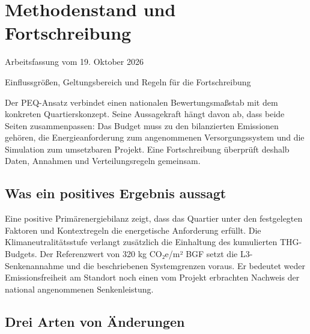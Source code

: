 \documentclass[
  ngerman,
  a4paper,
  DIV=11]{scrreprt}
\begin{document}
\chapter{Methodenstand und Fortschreibung}\label{sec-fortschreibung}

\begin{tcolorbox}[enhanced jigsaw, arc=.35mm, bottomrule=.15mm, breakable, colback=white, colframe=quarto-callout-note-color-frame, left=2mm, leftrule=.75mm, opacityback=0, rightrule=.15mm, toprule=.15mm]
\begin{minipage}[t]{5.5mm}
\textcolor{quarto-callout-note-color}{\faInfo}
\end{minipage}%
\begin{minipage}[t]{\textwidth - 5.5mm}

Arbeitsfassung vom 19. Oktober 2026

\end{minipage}%
\end{tcolorbox}

Einflussgrößen, Geltungsbereich und Regeln für die Fortschreibung

Der PEQ-Ansatz verbindet einen nationalen Bewertungsmaßstab mit dem
konkreten Quartierskonzept. Seine Aussagekraft hängt davon ab, dass
beide Seiten zusammenpassen: Das Budget muss zu den bilanzierten
Emissionen gehören, die Energieanforderung zum angenommenen
Versorgungssystem und die Simulation zum umsetzbaren Projekt. Eine
Fortschreibung überprüft deshalb Daten, Annahmen und Verteilungsregeln
gemeinsam.

\section{Was ein positives Ergebnis
aussagt}\label{was-ein-positives-ergebnis-aussagt}

Eine positive Primärenergiebilanz zeigt, dass das Quartier unter den
festgelegten Faktoren und Kontextregeln die energetische Anforderung
erfüllt. Die Klimaneutralitätsstufe verlangt zusätzlich die Einhaltung
des kumulierten THG-Budgets. Der Referenzwert von 320 kg CO₂e/m² BGF
setzt die L3-Senkenannahme und die beschriebenen Systemgrenzen voraus.
Er bedeutet weder Emissionsfreiheit am Standort noch einen vom Projekt
erbrachten Nachweis der national angenommenen Senkenleistung.

\section{Drei Arten von Änderungen}\label{drei-arten-von-uxe4nderungen}
\end{document}
